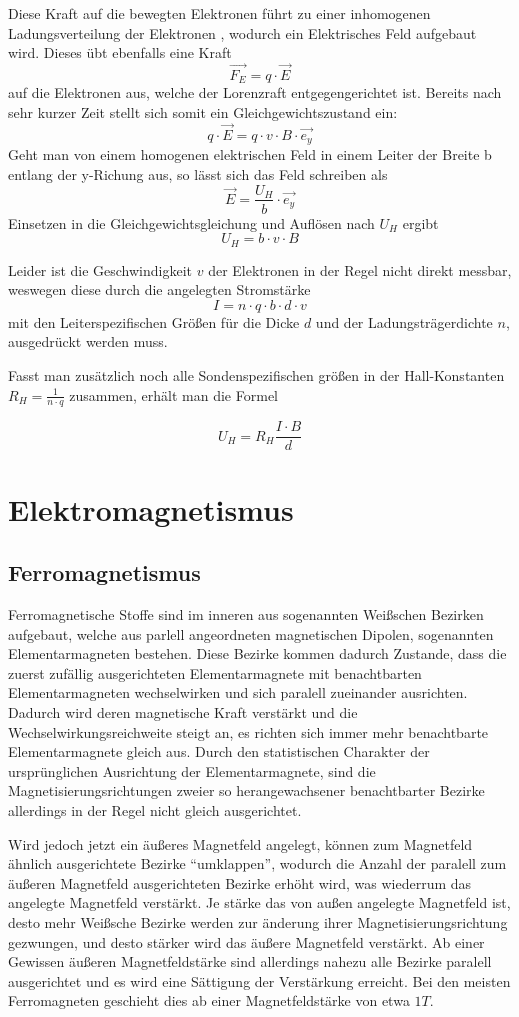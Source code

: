 \documentclass[bigchapter,colorback,accentcolor=tud4b,linedtoc,11pt]{tudreport}
\begin{document}
Diese Kraft auf die bewegten Elektronen führt zu einer inhomogenen Ladungsverteilung der Elektronen , wodurch ein Elektrisches Feld aufgebaut wird. Dieses übt ebenfalls eine Kraft 
$$\vec{F_E}=q \cdot \vec{E}$$
auf die Elektronen aus, welche der Lorenzraft entgegengerichtet ist. Bereits nach sehr kurzer Zeit stellt sich somit ein Gleichgewichtszustand ein:
$$q \cdot \vec{E} = q \cdot v  \cdot B \cdot \vec{e_y}$$
Geht man von einem homogenen elektrischen Feld in einem Leiter der Breite b entlang der y-Richung aus, so lässt sich das Feld schreiben als 
$$\vec{E} = \frac{U_H}{b}\cdot \vec{e_y}$$
Einsetzen in die Gleichgewichtsgleichung und Auflösen nach $U_H$ ergibt
$$U_H = b \cdot v \cdot B$$

Leider ist die Geschwindigkeit $v$ der Elektronen in der Regel nicht direkt messbar, weswegen diese durch die angelegten Stromstärke 
$$I= n\cdot q \cdot b \cdot d \cdot v$$
mit den Leiterspezifischen Größen für die Dicke $d$ und der Ladungsträgerdichte $n$, ausgedrückt werden muss.

Fasst man zusätzlich noch alle Sondenspezifischen größen in der Hall-Konstanten $R_H = \frac{1}{n\cdot q}$ zusammen, erhält man die Formel

$$U_H = R_H \frac{I\cdot B}{d}$$

\section{Elektromagnetismus}
\subsection{Ferromagnetismus}

Ferromagnetische Stoffe sind im inneren aus sogenannten Weißschen Bezirken aufgebaut, welche aus parlell angeordneten magnetischen Dipolen, sogenannten Elementarmagneten bestehen.
Diese Bezirke kommen dadurch Zustande, dass die zuerst zufällig ausgerichteten Elementarmagnete mit benachtbarten Elementarmagneten wechselwirken und sich paralell zueinander ausrichten. Dadurch wird deren magnetische Kraft verstärkt und die Wechselwirkungsreichweite steigt an, es richten sich immer mehr benachtbarte Elementarmagnete gleich aus. Durch den statistischen Charakter der ursprünglichen Ausrichtung der Elementarmagnete, sind die Magnetisierungsrichtungen zweier so herangewachsener benachtbarter Bezirke allerdings in der Regel nicht gleich ausgerichtet.

Wird jedoch jetzt ein äußeres Magnetfeld angelegt, können zum Magnetfeld ähnlich ausgerichtete Bezirke "`umklappen"', wodurch die Anzahl der paralell zum äußeren Magnetfeld ausgerichteten Bezirke erhöht wird, was wiederrum das angelegte Magnetfeld verstärkt. Je stärke das von außen angelegte Magnetfeld ist, desto mehr Weißsche Bezirke werden zur änderung ihrer Magnetisierungsrichtung gezwungen, und desto stärker wird das äußere Magnetfeld verstärkt. Ab einer Gewissen äußeren Magnetfeldstärke sind allerdings nahezu alle Bezirke paralell ausgerichtet und es wird eine Sättigung der Verstärkung erreicht. Bei den meisten Ferromagneten geschieht dies ab einer Magnetfeldstärke von etwa $1T$.
\end{document}
